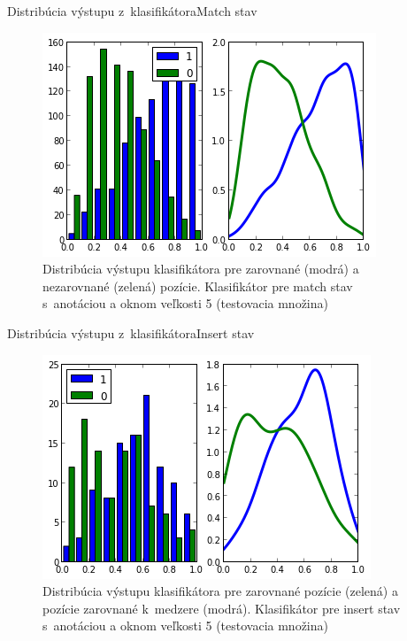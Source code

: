 \documentclass[xcolor=dvipsnames, compress, 12pt, t]{beamer}
\begin{document}
\begin{frame}{Distribúcia výstupu z~klasifikátora}{Match stav}
\begin{figure}[hbtp]
    \centering
    \includegraphics[height=0.5\textheight]{images/clf_m_test.png}
    \caption{Distribúcia výstupu klasifikátora pre zarovnané (modrá) a nezarovnané (zelená) pozície. Klasifikátor pre match stav s~anotáciou a oknom veľkosti 5 (testovacia množina)}
\end{figure}
\end{frame}

\begin{frame}{Distribúcia výstupu z~klasifikátora}{Insert stav}
\begin{figure}[hbtp]
    \centering
    \includegraphics[height=0.5\textheight]{images/clf_i_test.png}
    \caption{Distribúcia výstupu klasifikátora pre zarovnané pozície (zelená) a pozície zarovnané k~medzere (modrá). Klasifikátor pre insert stav s~anotáciou a oknom veľkosti 5 (testovacia množina)}
\end{figure}
\end{frame}
\end{document}
